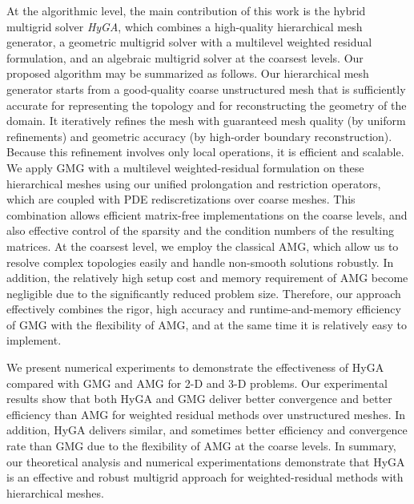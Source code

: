 \documentclass{report}
\begin{document}
At the algorithmic level, the main contribution of this work is the
hybrid multigrid solver \emph{HyGA}, which combines a high-quality
hierarchical mesh generator, a geometric multigrid solver with a multilevel
weighted residual formulation, and an algebraic multigrid solver at
the coarsest levels. Our proposed algorithm may be summarized as follows.
Our hierarchical mesh generator starts from a good-quality coarse
unstructured mesh that is sufficiently accurate for representing the
topology and for reconstructing the geometry of the domain. It iteratively
refines the mesh with guaranteed mesh quality (by uniform refinements)
and geometric accuracy (by high-order boundary reconstruction). Because
this refinement involves only local operations, it is efficient and
scalable. We apply GMG with a multilevel weighted-residual formulation
on these hierarchical meshes using our unified prolongation and restriction
operators, which are coupled with PDE rediscretizations over coarse
meshes. This combination allows efficient matrix-free implementations
on the coarse levels, and also effective control of the sparsity and
the condition numbers of the resulting matrices. At the coarsest level,
we employ the classical AMG, which allow us to resolve complex topologies
easily and handle non-smooth solutions robustly. In addition, the
relatively high setup cost and memory requirement of AMG become negligible
due to the significantly reduced problem size. Therefore, our approach
effectively combines the rigor, high accuracy and runtime-and-memory
efficiency of GMG with the flexibility of AMG, and at the same time
it is relatively easy to implement.

We present numerical experiments to demonstrate the effectiveness
of HyGA compared with GMG and AMG for 2-D and 3-D problems. Our experimental
results show that both HyGA and GMG deliver better convergence and
better efficiency than AMG for weighted residual methods over unstructured
meshes. In addition, HyGA delivers similar, and sometimes better efficiency
and convergence rate than GMG due to the flexibility of AMG at the
coarse levels. In summary, our theoretical analysis and numerical
experimentations demonstrate that HyGA is an effective and robust
multigrid approach for weighted-residual methods with hierarchical
meshes.
\end{document}
